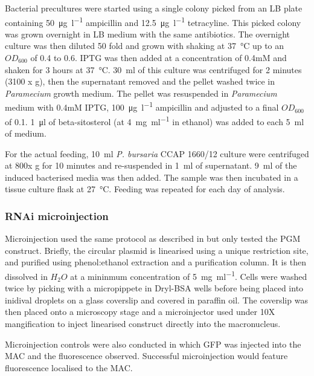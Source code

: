 Bacterial precultures were started using a single colony picked from an LB
plate containing \SI{50}{\micro\gram\per\litre} ampicillin and \SI{12.5}{\micro\gram\per\litre} tetracyline.
This picked colony was grown overnight in LB medium with the same antibiotics.
The overnight culture was then diluted 50 fold and grown with shaking
at \SI{37}{\degreeCelsius} up to an \(OD_{600}\) of 0.4 to 0.6. IPTG
was then added at a concentration of 0.4mM and shaken for 3 hours
at \SI{37}{\degreeCelsius}.  \SI{30}{\milli\litre} of this culture was centrifuged for 
2 minutes (3100 x g),
then the supernatant removed and the pellet washed twice in \textit{Paramecium}
growth medium. The pellet was resuspended in \textit{Paramecium} medium with 0.4mM IPTG,
\SI{100}{\micro\gram\per\litre} ampicillin and adjusted to a final \(OD_{600}\) of 0.1.
\SI{1}{\micro\litre} of beta-sitosterol (at \SI{4}{\milli\gram\per\milli\litre} in ethanol) was added
to each \SI{5}{\milli\litre} of medium.

For the actual feeding, \SI{10}{\milli\litre} \textit{P. bursaria} CCAP 1660/12 culture
were centrifuged at 800x g for 10 minutes and re-suspended in \SI{1}{\milli\litre} of supernatant.
\SI{9}{\milli\litre} of the induced bacterised media was then added.  The sample was
then incubated in a tissue culture flask at \SI{27}{\degreeCelsius}.
Feeding was repeated for each day of analysis. 

\subsubsection{RNAi microinjection}

Microinjection used the same protocol as described in \citep{Beisson2010b} 
but only tested the PGM construct.
Briefly, the circular plasmid is linearised using a unique restriction site,
and purified using phenol:ethanol extraction and a purification column.
It is then dissolved in \(H_{2}O\) at a mininmum concentration of 
\SI{5}{\milli\gram\per\milli\litre}.
Cells were washed twice by picking with a micropippete in Dryl-BSA wells before
being placed into inidival droplets on a glass coverslip and covered in paraffin oil.
The coverslip was then placed onto a microscopy stage and a microinjector 
used under 10X mangification to inject linearised construct directly into the
macronucleus.

Microinjection controls were also conducted in which GFP was injected
into the MAC and the fluorescence observed.  Successful microinjection
would feature fluorescence localised to the MAC.

